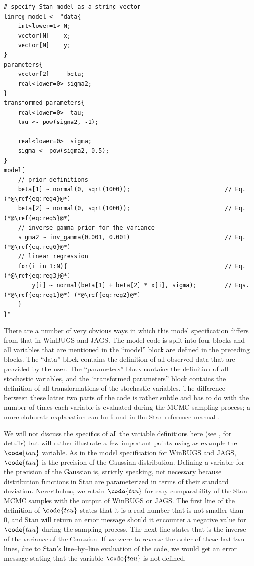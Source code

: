 \begin{lstlisting}
# specify Stan model as a string vector
linreg_model <- "data{
    int<lower=1> N;
    vector[N]    x;
    vector[N]    y;
}
parameters{
    vector[2]     beta;
    real<lower=0> sigma2;
}
transformed parameters{
    real<lower=0>  tau;
    tau <- pow(sigma2, -1);
	
    real<lower=0>  sigma;
    sigma <- pow(sigma2, 0.5);
}
model{
    // prior definitions
    beta[1] ~ normal(0, sqrt(1000));                           // Eq. (*@\ref{eq:reg4}@*)
    beta[2] ~ normal(0, sqrt(1000));                           // Eq. (*@\ref{eq:reg5}@*)
    // inverse gamma prior for the variance
    sigma2 ~ inv_gamma(0.001, 0.001)                           // Eq. (*@\ref{eq:reg6}@*)
    // linear regression
    for(i in 1:N){                                             // Eq. (*@\ref{eq:reg3}@*)
        y[i] ~ normal(beta[1] + beta[2] * x[i], sigma);        // Eqs. (*@\ref{eq:reg1}@*)-(*@\ref{eq:reg2}@*)
    }
}"
\end{lstlisting}
\noindent There are a number of very obvious ways in which this model specification differs from that in WinBUGS and JAGS. The model code is split into four blocks and all variables that are mentioned in the ``model'' block are defined in the preceding blocks. The ``data'' block contains the definition of all observed data that are provided by the user. The ``parameters'' block contains the definition of all stochastic variables, and the ``transformed parameters'' block contains the definition of all transformations of the stochastic variables. The difference between these latter two parts of the code is rather subtle and has to do with the number of times each variable is evaluated during the MCMC sampling process; a more elaborate explanation can be found in the Stan reference manual \cite{StanMan}.

We will not discuss the specifics of all the variable definitions here (see , for details) but will rather illustrate a few important points using as example the $\code{tau}$ variable. As in the model specification for WinBUGS and JAGS, $\code{tau}$ is the precision of the Gaussian distribution. Defining a variable for the precision of the Gaussian is, strictly speaking, not necessary because distribution functions in Stan are parameterized in terms of their standard deviation. Nevertheless, we retain $\code{tau}$ for easy comparability of the Stan MCMC samples with the output of WinBUGS or JAGS. The first line of the definition of $\code{tau}$ states that it is a real number that is not smaller than 0, and Stan will return an error message should it encounter a negative value for $\code{tau}$ during the sampling process. The next line states that  is the inverse of the variance of the Gaussian. If we were to reverse the order of these last two lines, due to Stan's line--by--line evaluation of the code, we would get an error message stating that the variable $\code{tau}$ is not defined.

